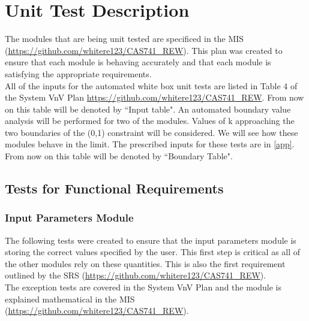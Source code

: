 \documentclass[12pt, titlepage]{article}
\begin{document}

\section{Unit Test Description} \label{testDescription} 

The modules that are being unit tested are specificed in the MIS 
(\url{https://github.com/whitere123/CAS741_REW}). This plan was created to 
ensure that each module is behaving accurately and that each module is 
satisfying the appropriate requirements.  \\

All of the inputs for the automated white box unit tests are listed in Table 4 
of the System VnV Plan \url{https://github.com/whitere123/CAS741_REW}. From now 
on this table will be denoted by ``Input table". An automated boundary value 
analysis will be performed for two of the modules. Values of k approaching the 
two boundaries of the (0,1) constraint will be considered. We will see how 
these modules behave in the limit. The prescribed inputs for these tests are in 
\ref{app}. From now on this table will be denoted by ``Boundary Table". 

\subsection{Tests for Functional Requirements}


\subsubsection{Input Parameters Module}

The following tests were created to ensure that the input parameters module is 
storing the correct values specified by the user. This first step is critical 
as all of the other modules rely on these quantities. This is also the first 
requirement outlined by the SRS 
(\url{https://github.com/whitere123/CAS741_REW}). \\
The exception tests are covered in the System 
VnV Plan and the module is explained mathematical in the 
MIS (\url{https://github.com/whitere123/CAS741_REW}). \\
\end{document}
